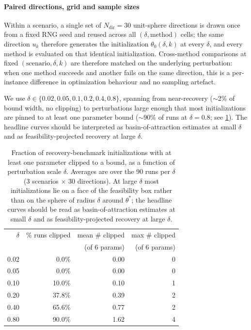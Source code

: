 \paragraph{Paired directions, grid and sample sizes}\label{sec:method:opt:recovery-benchmark:grid}
Within a scenario, a single set of $N_{\text{dir}} = 30$ unit-sphere directions is drawn once from a fixed RNG seed and reused across all $(\delta, \text{method})$ cells;
the same direction $u_k$ therefore generates the initialization $\theta_0(\delta, k)$ at every $\delta$, and every method is evaluated on that identical initialization.
Cross-method comparisons at fixed $(\text{scenario}, \delta, k)$ are therefore matched on the underlying perturbation:
when one method succeeds and another fails on the same direction, this is a per-instance difference in optimization behaviour and no sampling artefact.

We use $\delta \in \{0.02, 0.05, 0.1, 0.2, 0.4, 0.8\}$, spanning from near-recovery ($\sim$2\% of bound width, no clipping)
to perturbations large enough that most initializations are pinned to at least one parameter bound ($\sim$90\% of runs at $\delta = 0.8$; see \cref{tab:clipping}).
The headline curves should be interpreted as basin-of-attraction estimates at small $\delta$ and as feasibility-projected recovery at large $\delta$.

\begin{table}[!hb]
  \centering
  \caption{Fraction of recovery-benchmark initializations with at
  least one parameter clipped to a bound, as a function of
  perturbation scale $\delta$. Averages are over the 90 runs per
  $\delta$ (3 scenarios $\times$ 30 directions). At large $\delta$
  most initializations lie on a face of the feasibility box rather
  than on the sphere of radius $\delta$ around $\theta^{*}$; the
  headline curves should be read as basin-of-attraction estimates
  at small $\delta$ and as feasibility-projected recovery at large
  $\delta$.}
  \label{tab:clipping}
  \begin{tabular}{rrrr}
  \toprule
  $\delta$ & \% runs clipped & mean \# clipped & max \# clipped \\
           &                 & (of 6 params)   & (of 6 params)  \\
  \midrule
  0.02 &  0.0\% & 0.00 & 0 \\
  0.05 &  0.0\% & 0.00 & 0 \\
  0.10 & 10.0\% & 0.10 & 1 \\
  0.20 & 37.8\% & 0.39 & 2 \\
  0.40 & 65.6\% & 0.77 & 2 \\
  0.80 & 90.0\% & 1.62 & 4 \\
  \bottomrule
  \end{tabular}
\end{table}

